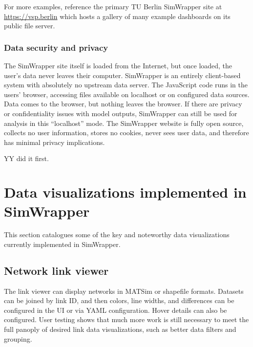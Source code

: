 \documentclass[3p,times,procedia]{elsarticle}
\begin{document}
For more examples, reference the primary TU Berlin SimWrapper site at \url{https://vsp.berlin} which hosts a gallery of many example dashboards on its public file server.

\subsubsection{Data security and privacy}

The SimWrapper site itself is loaded from the Internet, but once loaded, the user's data never leaves their computer. SimWrapper is an entirely client-based system with absolutely no upstream data server. The JavaScript code runs in the users' browser, accessing files available on localhost or on configured data sources. Data comes to the browser, but nothing leaves the browser. If there are privacy or confidentiality issues with model outputs, SimWrapper can still be used for analysis in this ``localhost'' mode. The SimWrapper website is fully open source, collects no user information, stores no cookies, never sees user data, and therefore has minimal privacy implications.


YY \cite{CharltonLaudan2020WebBasedVisualization} did it first.

\section{Data visualizations implemented in SimWrapper}

This section catalogues some of the key and noteworthy data visualizations currently implemented in SimWrapper.

\subsection{Network link viewer}

The link viewer can display networks in MATSim or shapefile formats. Datasets can be joined by link ID, and then colors, line widths, and differences can be configured in the UI or via YAML configuration. Hover details can also be configured. User testing shows that much more work is still necessary to meet the full panoply of desired link data visualizations, such as better data filters and grouping.
\end{document}

